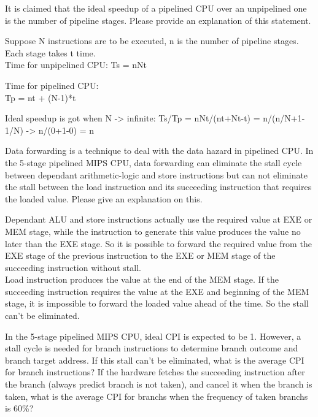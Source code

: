 \documentclass[a4paper, 12pt, addpoints]{exam}
\begin{document}
\begin{questions}
\raggedright

\question[10]
It is claimed that the ideal speedup of a pipelined CPU over an unpipelined one is the number of pipeline stages. Please provide an explanation of this statement.

\begin{solution} 
\newpage

Suppose N instructions are to be executed, n is the number of pipeline stages. Each stage takes t time. \\
Time for unpipelined CPU:
\centering Ts = nNt   \\
\raggedright Time for pipelined CPU: \\
\centering Tp = nt + (N-1)*t   \\
\raggedright Ideal speedup is got when N -> infinite:
\centering Ts/Tp = nNt/(nt+Nt-t) = n/(n/N+1-1/N) -> n/(0+1-0) = n
\end{solution} 
\newpage


\raggedright

\question[10]
Data forwarding is a technique to deal with the data hazard in pipelined CPU. In the 5-stage pipelined MIPS CPU, data forwarding can eliminate the stall cycle between dependant arithmetic-logic and store instructions but can not eliminate the stall between the load instruction and its succeeding instruction that requires the loaded value. Please give an explanation on this.

\begin{solution} 
\newpage

Dependant ALU and store instructions actually use the required value at EXE or MEM stage, while the instruction to generate this value produces the value no later than the EXE stage. So it is possible to forward the required value from the EXE stage of the previous instruction to the EXE or MEM stage of the succeeding instruction without stall. \\
Load instruction produces the value at the end of the MEM stage. If the succeeding instruction requires the value at the EXE and beginning of the MEM stage, it is impossible to forward the loaded value ahead of the time. So the stall can't be eliminated.
\end{solution} 
\newpage


\raggedright

\question[10]
In the 5-stage pipelined MIPS CPU, ideal CPI is expected to be 1. However, a stall cycle is needed for branch instructions to determine branch outcome and branch target address. If this stall can't be eliminated, what is the average CPI for branch instructions? If the hardware fetches the succeeding instruction after the branch (always predict branch is not taken), and cancel it when the branch is taken, what is the average CPI for branchs when the frequency of taken branchs is 60\%? 


\end{questions}
\end{document}
